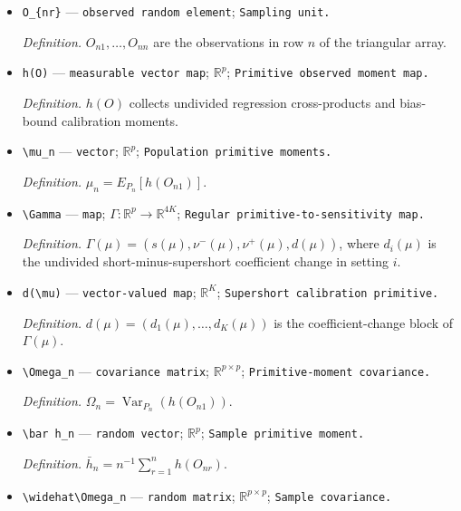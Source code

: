\documentclass{article}
\begin{document}
\begin{itemize}
  \par\smallskip\noindent\emph{Definition.} \(P_n\) is the row-\(n\) sampling law.
  \item \texttt{O\_\allowbreak{}\{nr\}\allowbreak{}} --- \texttt{observed random element}; \texttt{Sampling unit.}
  \par\smallskip\noindent\emph{Definition.} \(O_{n1},\ldots,O_{nn}\) are the observations in row \(n\) of the triangular array.
  \item \texttt{h(O)} --- \texttt{measurable vector map}; \(\mathbb R^p\); \texttt{Primitive observed moment map.}
  \par\smallskip\noindent\emph{Definition.} \(h(O)\) collects undivided regression cross-products and bias-bound calibration moments.
  \item \texttt{\textbackslash{}\allowbreak{}mu\_\allowbreak{}n} --- \texttt{vector}; \(\mathbb R^p\); \texttt{Population primitive moments.}
  \par\smallskip\noindent\emph{Definition.} \(\mu_n=E_{P_n}[h(O_{n1})]\).
  \item \texttt{\textbackslash{}\allowbreak{}Gamma} --- \texttt{map}; \(\Gamma:\mathbb R^p\to\mathbb R^{4K}\); \texttt{Regular primitive-\allowbreak{}to-\allowbreak{}sensitivity map.}
  \par\smallskip\noindent\emph{Definition.} \(\Gamma(\mu)=(s(\mu),\nu^-(\mu),\nu^+(\mu),d(\mu))\), where \(d_i(\mu)\) is the undivided short-minus-supershort coefficient change in setting \(i\).
  \item \texttt{d(\textbackslash{}\allowbreak{}mu)} --- \texttt{vector-\allowbreak{}valued map}; \(\mathbb R^K\); \texttt{Supershort calibration primitive.}
  \par\smallskip\noindent\emph{Definition.} \(d(\mu)=(d_1(\mu),\ldots,d_K(\mu))\) is the coefficient-change block of \(\Gamma(\mu)\).
  \item \texttt{\textbackslash{}\allowbreak{}Omega\_\allowbreak{}n} --- \texttt{covariance matrix}; \(\mathbb R^{p\times p}\); \texttt{Primitive-\allowbreak{}moment covariance.}
  \par\smallskip\noindent\emph{Definition.} \(\Omega_n=\operatorname{Var}_{P_n}(h(O_{n1}))\).
  \item \texttt{\textbackslash{}\allowbreak{}bar h\_\allowbreak{}n} --- \texttt{random vector}; \(\mathbb R^p\); \texttt{Sample primitive moment.}
  \par\smallskip\noindent\emph{Definition.} \(\bar h_n=n^{-1}\sum_{r=1}^n h(O_{nr})\).
  \item \texttt{\textbackslash{}\allowbreak{}widehat\textbackslash{}\allowbreak{}Omega\_\allowbreak{}n} --- \texttt{random matrix}; \(\mathbb R^{p\times p}\); \texttt{Sample covariance.}

\end{itemize}
\end{document}
